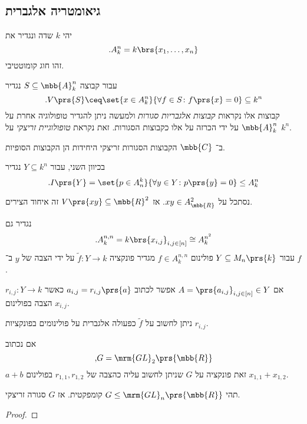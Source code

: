 \documentclass[10pt, twoside]{book}
\begin{document}
\subsection{גיאומטריה אלגברית}

יהי
$k$
שדה ונגדיר את
\[\text{.} A_k^n = k\brs{x_1, \ldots, x_n}\]
זהו חוג קומוטטיבי.

עבור קבוצה
$S \subseteq \mbb{A}^n_k$
נגדיר
\[\text{.} V\prs{S} \ceq \set{x \in A_k^n}{\forall f \in S \colon f\prs{x} = 0} \subseteq k^n \]
קבוצות אלו נקראות
\emph{קבוצות אלגבריות סגורות}
ולמעשה ניתן להגדיר טופולוגיה אחרת על
$\mbb{A}_k^n$
על ידי הכרזה על אלו כקבוצות הסגורות.
זאת נקראת
\emph{טופולוגיית זריצקי}
על
$k^n$.

\begin{example}
ב־%
$\mbb{C}$
הקבוצות הסגורות זריצקי היחידות הן הקבוצות הסופיות.
\end{example}

בכיוון השני, עבור
$Y \subseteq k^n$
נגדיר
\[\text{.} I\prs{Y} = \set{p \in {A}_n^k}{\forall y \in Y \colon p\prs{y} = 0} \leq {A}_k^n\]

\begin{example}
נסתכל על
$xy \in A_\mbb{R}^2$.
אז
$V\prs{xy} \subseteq \mbb{R}^2$
זה איחוד הצירים.
\end{example}

נגדיר גם
\[\text{.}A^{n,n}_k = k\brs{x_{i,j}}_{i,j \in [n]} \cong A^{n^2}_k\]
עבור
$Y \subseteq M_n\prs{k}$
פולינום
$f \in A^{n,n}_k$
מגדיר פונקציה
$\tilde{f} \colon Y \to k$
על ידי הצבה של
$y$
ב־%
$f$.

אם
$A = \prs{a_{i,j}}_{i,j \in [n]} \in Y$
אפשר לכתוב
$a_{i,j} = r_{i,j}\prs{a}$
כאשר
$r_{i,j} \colon Y \to k$
הצבה בפולינום
$x_{i,j}$.

ניתן לחשוב על
$\tilde{f}$
כפעולה אלגברית על פולינומים בפונקציות
$r_{i,j}$.

\begin{example}
אם נכתוב
\[\text{,}G = \mrm{GL}_2\prs{\mbb{R}}\]
$a+b$
זאת פונקציה על
$G$
שניתן לחשוב עליה כהצבה של
$r_{1,1}, r_{1,2}$
בפולינום
$x_{1,1} + x_{1,2}$.
\end{example}

\begin{theorem}
תהי
$G \leq \mrm{GL}_n\prs{\mbb{R}}$
קומפקטית. אז
$G$
סגורה זריצקי.
\end{theorem}

\begin{proof}

\end{proof}
\end{document}
